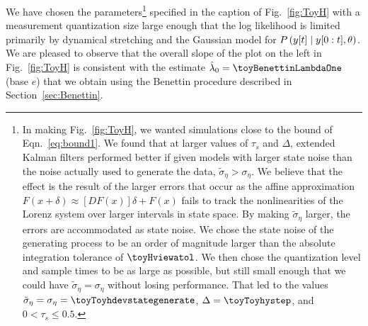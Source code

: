 We have chosen the parameters\footnote{ In making Fig.~\ref{fig:ToyH},
  we wanted simulations close to the bound of Eqn.~\eqref{eq:bound1}.
  We found that at larger values of $\tau_s$ and $\Delta$, extended
  Kalman filters performed better if given models with larger state
  noise than the noise actually used to generate the data, \ie
  $\tilde \sigma_\eta > \sigma_\eta$.  We believe that the effect is
  the result of the larger errors that occur as the affine
  approximation $F(x+\delta) \approx [DF(x)] \delta + F(x)$ fails to
  track the nonlinearities of the Lorenz system over larger intervals
  in state space.  By making $\tilde \sigma_\eta$ larger, the errors
  are accommodated as state noise.  We chose the state noise of the
  generating process to be an order of magnitude larger than the
  absolute integration tolerance of $\toyHviewatol$.  We then chose
  the quantization level and sample times to be as large as possible,
  but still small enough that we could have
  $\tilde \sigma_\eta = \sigma_\eta$ without losing performance.  That
  led to the values
  $\tilde \sigma_\eta = \sigma_\eta = \toyToyhdevstategenerate$,
  $\Delta = \toyToyhystep$, and $0 < \tau_s \leq 0.5$.} specified in
the caption of Fig.~\ref{fig:ToyH} with a measurement quantization
size large enough that the log likelihood is limited primarily by
dynamical stretching and the Gaussian model for
$ P \left({y}{[t]}\mid y[0:t], \theta \right)$.  We are pleased
to observe that the overall slope of the plot on the left in
Fig.~\ref{fig:ToyH} is consistent with the estimate
$\hat \lambda_0 = \toyBenettinLambdaOne$ (base $e$) that we obtain
using the Benettin procedure described in Section~\ref{sec:Benettin}.

